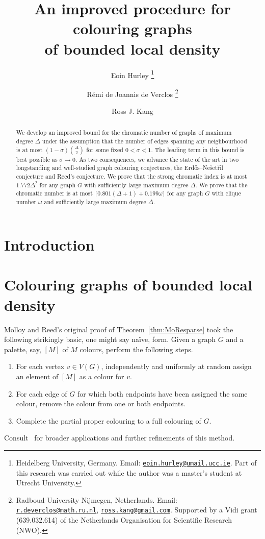 \documentclass[11pt]{article}
\title{An improved procedure for colouring graphs \\of bounded local density}
\author{
Eoin Hurley
\thanks{Heidelberg University, Germany.
Email: \protect\href{mailto:eoin.hurley@umail.ucc.ie}{\protect\nolinkurl{eoin.hurley@umail.ucc.ie}}. Part of this research was carried out while the author was a master's student at Utrecht University.}
\and
R\'emi de Joannis de Verclos
\thanks{Radboud University Nijmegen, Netherlands. 
Email: \protect\href{mailto:r.deverclos@math.ru.nl}{\protect\nolinkurl{r.deverclos@math.ru.nl}}, \protect\href{mailto:ross.kang@gmail.com}{\protect\nolinkurl{ross.kang@gmail.com}}. Supported by a Vidi grant (639.032.614) of the Netherlands Organisation for Scientific Research (NWO).}
\and
Ross J. Kang
\footnotemark[2]
}
\theoremstyle{plain}
\begin{document}
\maketitle

\begin{abstract}
We develop an improved bound for the chromatic number of graphs of maximum degree $\Delta$ under the assumption that the number of edges spanning any neighbourhood is at most $(1-\sigma)\binom{\Delta}{2}$ for some fixed $0<\sigma<1$.
The leading term in this bound is best possible as $\sigma\to0$.
As two consequences, we advance the state of the art in two longstanding and well-studied graph colouring conjectures, the Erd\H{o}s--Ne\v{s}et\v{r}il conjecture and Reed's conjecture.
We prove that the strong chromatic index is at most $1.772\Delta^2$ for any graph $G$ with sufficiently large maximum degree $\Delta$.
We prove that the chromatic number is at most $\lceil 0.801(\Delta+1)+0.199\omega\rceil$ for any graph $G$ with clique number $\omega$ and sufficiently large maximum degree $\Delta$.
\end{abstract}




\section{Introduction}





\section{Colouring graphs of bounded local density}\label{sec:proof}


Molloy and Reed's original proof of Theorem~\ref{thm:MoResparse} took the following strikingly basic, one might say na\"ive, form.
Given a graph $G$ and a palette, say, $[M]$ of $M$ colours, perform the following steps.
\begin{enumerate}
\item\label{naivestep1}
For each vertex $v\in V(G)$, independently and uniformly at random assign an element of $[M]$ as a colour for $v$.
\item\label{naivestep2}
For each edge of $G$ for which both endpoints have been assigned the same colour, remove the colour from one or both endpoints.
\item\label{naivestep3}
Complete the partial proper colouring to a full colouring of $G$.
\end{enumerate}
\noindent
Consult~\cite{MoRe02} for broader applications and further refinements of this method.
\end{document}
